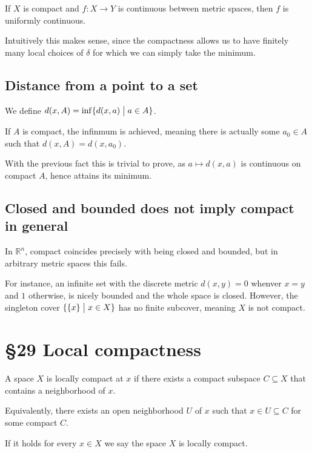 \documentclass[11pt]{article}
\begin{document}
\begin{thm}
    If $X$ is compact and $f: X \to Y$ is 
    continuous between metric spaces, then 
    $f$ is uniformly continuous. 
\end{thm}

Intuitively this makes sense, since 
the compactness allows us to have finitely 
many local choices of $\delta$ for which we can 
simply take the minimum. 

\subsection{Distance from a point to a set} 

We define $d(x,A) = \inf\{d(x,a) \bigm| a \in A\}$. 

If $A$ is compact, the infinmum is achieved, meaning 
there is actually some $a_0 \in A$ such that 
$d(x,A) = d(x,a_0)$. 

With the previous fact this is trivial to prove, as 
$a \mapsto d(x,a)$ is continuous on compact $A$, hence 
attains its minimum. 

\subsection{Closed and bounded does not imply compact in general}

In $\mathbb R^n$, compact coincides precisely with being 
closed and bounded, but in arbitrary metric spaces this fails. 

For instance, an infinite set with the discrete 
metric $d(x,y) = 0$ whenver $x = y$ and $1$ otherwise, 
is nicely bounded and the whole space 
is closed. 
However, the singleton cover $\{\{x\} \bigm| x \in X\}$ 
has no finite subcover, meaning $X$ is not compact. 

\section{\S 29 Local compactness}
\begin{defn}
    A space $X$ is locally compact at $x$ if there 
    exists a compact subspace $C \subseteq X$ 
    that contains a neighborhood of $x$. 

    Equivalently, there exists an open neighborhood 
    $U$ of $x$ such that $x \in U \subseteq C$ for 
    some compact $C$. 

    If it holds for every $x\in X$ we say the 
    space $X$ is locally compact. 
\end{defn}
\end{document}
